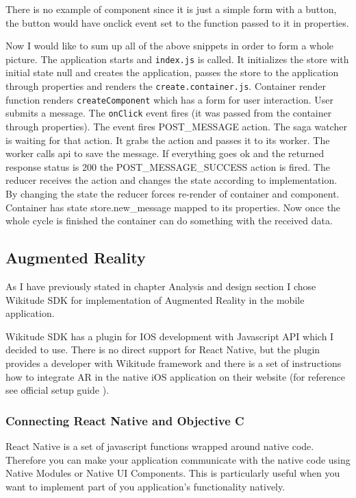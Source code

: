 \documentclass[thesis=M,english]{FITthesis}[2012/10/20]
\begin{document}
There is no example of component since it is just a simple form with a button, the button would have onclick event set to the function passed to it in properties.

Now I would like to sum up all of the above snippets in order to form a whole picture. The application starts and \verb|index.js| is called. It initializes the store with initial state null and creates the application, passes the store to the application through properties and renders the \verb|create.container.js|. Container render function renders \verb|createComponent| which has a form for user interaction. User submits a message. The \verb|onClick| event fires (it was passed from the container through properties). The event fires POST\_MESSAGE action. The saga watcher is waiting for that action. It grabs the action and passes it to its worker. The worker calls api to save the message. If everything goes ok and the returned response status is 200 the POST\_MESSAGE\_SUCCESS action is fired. The reducer receives the action and changes the state according to implementation. By changing the state the reducer forces re-render of container and component. Container has state store.new\_message mapped to its properties. Now once the whole cycle is finished the container can do something with the received data. 

\subsection{Augmented Reality}
As I have previously stated in chapter Analysis and design section  I chose Wikitude SDK for implementation of Augmented Reality in the mobile application. 

Wikitude SDK has a plugin for IOS development with Javascript API which I decided to use. There is no direct support for React Native, but the plugin provides a developer with Wikitude framework and there is a set of instructions how to integrate AR in the native iOS application on their website (for reference see official setup guide \cite{wikitude}). 

\subsubsection{Connecting React Native and Objective C}
React Native is a set of javascript functions wrapped around native code. Therefore you can make your application communicate with the native code using Native Modules or Native UI Components. This is particularly useful when you want to implement part of you application's functionality natively.  
\end{document}
